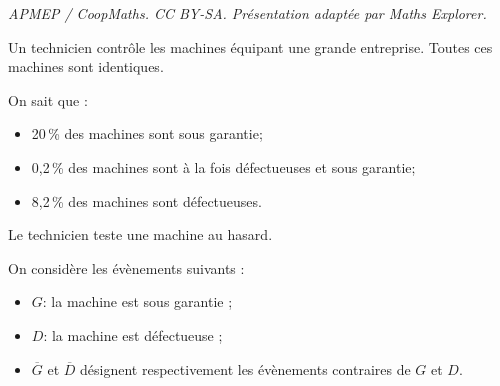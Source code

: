 \documentclass[10pt]{article}
\begin{document}
\noindent\textit{APMEP / CoopMaths. CC BY-SA. Présentation adaptée par Maths Explorer.}\par\medskip
Un technicien contrôle les machines équipant une grande entreprise. Toutes ces machines sont identiques.

On sait que :

\begin{itemize}
\item[$\bullet~~$]20\,\% des machines sont sous garantie;
\item[$\bullet~~$]0,2\,\% des machines sont à la fois défectueuses et sous garantie;
\item[$\bullet~~$]8,2\,\% des machines sont défectueuses.
\end{itemize}

\smallskip

Le technicien teste une machine au hasard.




On considère les évènements suivants :
\begin{itemize}
\item[$\bullet~~$]$G$: \og la machine est sous garantie \fg{} ;
\item[$\bullet~~$]$D$: \og la machine est défectueuse\fg{} ;
\item[$\bullet~~$]$\overline{G}$ et $\overline{D}$ désignent respectivement les évènements contraires de $G$ et $D$.
\end{itemize}
\end{document}
